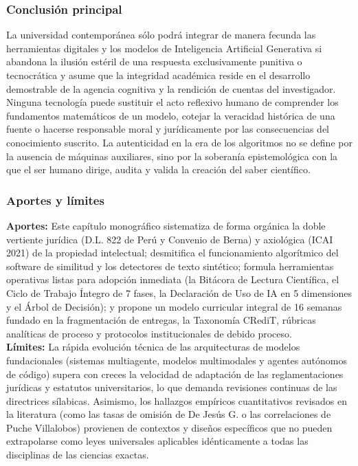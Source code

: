\subsubsection*{Conclusión principal}
La universidad contemporánea sólo podrá integrar de manera fecunda las herramientas digitales y los modelos de Inteligencia Artificial Generativa si abandona la ilusión estéril de una respuesta exclusivamente punitiva o tecnocrática y asume que la integridad académica reside en el desarrollo demostrable de la agencia cognitiva y la rendición de cuentas del investigador. Ninguna tecnología puede sustituir el acto reflexivo humano de comprender los fundamentos matemáticos de un modelo, cotejar la veracidad histórica de una fuente o hacerse responsable moral y jurídicamente por las consecuencias del conocimiento suscrito. La autenticidad en la era de los algoritmos no se define por la ausencia de máquinas auxiliares, sino por la soberanía epistemológica con la que el ser humano dirige, audita y valida la creación del saber científico.

\subsubsection*{Aportes y límites}
\textbf{Aportes:} Este capítulo monográfico sistematiza de forma orgánica la doble vertiente jurídica (D.L. 822 de Perú y Convenio de Berna) y axiológica (ICAI 2021) de la propiedad intelectual; desmitifica el funcionamiento algorítmico del software de similitud y los detectores de texto sintético; formula herramientas operativas listas para adopción inmediata (la Bitácora de Lectura Científica, el Ciclo de Trabajo Íntegro de 7 fases, la Declaración de Uso de IA en 5 dimensiones y el Árbol de Decisión); y propone un modelo curricular integral de 16 semanas fundado en la fragmentación de entregas, la Taxonomía CRediT, rúbricas analíticas de proceso y protocolos institucionales de debido proceso.\\[0.15cm]
\textbf{Límites:} La rápida evolución técnica de las arquitecturas de modelos fundacionales (sistemas multiagente, modelos multimodales y agentes autónomos de código) supera con creces la velocidad de adaptación de las reglamentaciones jurídicas y estatutos universitarios, lo que demanda revisiones continuas de las directrices sílabicas. Asimismo, los hallazgos empíricos cuantitativos revisados en la literatura (como las tasas de omisión de De Jesús G. o las correlaciones de Puche Villalobos) provienen de contextos y diseños específicos que no pueden extrapolarse como leyes universales aplicables idénticamente a todas las disciplinas de las ciencias exactas.

